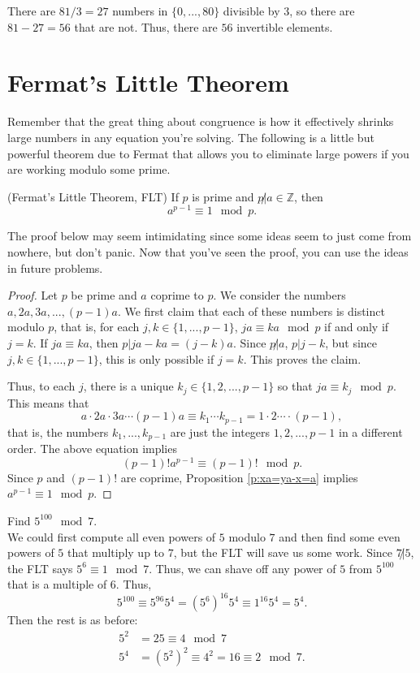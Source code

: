 \documentclass[11pt,dvipsnames]{book}
\numberwithin{equation}{section} %
\numberwithin{figure}{section} %
\numberwithin{table}{section} %
\begin{document}
\begin{exercise}
 
There are $81/3=27$ numbers in $\{0,...,80\}$ divisible by 3,   so there are $81-27=56$ that are not.  Thus, there are $56$ invertible elements. 
 
 





\section{Fermat's Little Theorem}
 
 Remember that the great thing about congruence is how it effectively shrinks large numbers in any equation you're solving. The following is a little but powerful theorem due to Fermat that allows you to eliminate large powers if you are working modulo some prime. 
 
\begin{theorem} (Fermat's Little Theorem, FLT)
If $p$ is prime and $p\not|a\in \mathbb{Z}$, then
\[
a^{p-1}\equiv 1\mod p. 
\]
\end{theorem}

The proof below may seem intimidating since some ideas seem to just come from nowhere, but don't panic. Now that you've seen the proof, you can use the ideas in future problems.

\begin{proof}
Let $p$ be prime and $a$ coprime to $p$. We consider the numbers $a,2a,3a,...,(p-1)a$. We first claim that each of these numbers is distinct modulo $p$, that is, for each $j,k\in \{1,...,p-1\}$, $ja\equiv ka\mod p$ if and only if $j=k$. If $ja\equiv ka$, then $p|ja-ka=(j-k)a$. Since $p\not|a$, $p|j-k$, but since $j,k\in \{1,...,p-1\}$, this is only possible if $j=k$. This proves the claim. 

Thus, to each $j$, there is a unique $k_j\in \{1,2,...,p-1\}$ so that $ja\equiv k_j \mod p$. This means that 
\[
a\cdot 2a \cdot 3a\cdots (p-1)a \equiv 
k_1\cdots k_{p-1} = 1\cdot 2 \cdots \cdot (p-1),\]
that is, the numbers $k_1,...,k_{p-1}$ are just the integers $1,2,...,p-1$ in a different order. The above equation implies
\[
(p-1)!a^{p-1}\equiv (p-1)!\mod p.
\]
Since $p$ and $(p-1)!$ are coprime, Proposition \ref{p:xa=ya-x=a} implies $a^{p-1}\equiv 1 \mod p$. 
\end{proof}

\begin{example}
Find $5^{100}\mod 7$. \\

We could first compute all even powers of $5$ modulo $7$ and then find some even powers of $5$ that multiply up to $7$, but the FLT will save us some work. Since $7\not|5$, the FLT says $5^{6}\equiv 1\mod 7$. Thus, we can shave off any power of $5$ from $5^{100}$ that is a multiple of $6$. Thus,
\[
5^{100}\equiv 5^{96}5^{4}=(5^{6})^{16}5^{4}\equiv 1^{16}5^{4}= 5^{4}.
\]
Then the rest is as before: 
\begin{align*}
5^{2} & =25\equiv 4\mod 7\\
5^{4} & =(5^{2})^{2}\equiv 4^{2}=16\equiv 2\mod 7.
\end{align*}
\end{example}


\end{exercise}
\end{document}
